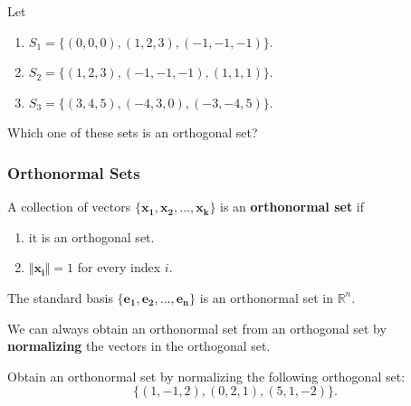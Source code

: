 \documentclass[20pt,a4paper]{extarticle}
\newcounter{example}
\newcounter{definition}
\begin{document}
	\vspace*{10pt}

	\begin{example}
	Let 
		\begin{enumerate}[label=\alph*)]
		\item $S_1 = \{ (0, 0, 0) , (1, 2, 3) , (-1, -1, -1) \}$.
		\item $S_2 = \{ (1, 2, 3 ) , (-1, -1, - 1) , (1, 1, 1) \}$.
		\item $S_3 = \{ (3, 4, 5) , (-4, 3, 0) , (-3, -4, 5) \}$. 
		\end{enumerate}
	Which one of these sets is an orthogonal set?
	\end{example}

	\begin{solution}

	\end{solution}

	\newpage 

	\subsubsection{Orthonormal Sets}

	\begin{definition}
	A collection of vectors $\{ \mathbf{x_1} , \mathbf{x_2} , \ldots , \mathbf{x_k} \}$ is an \textbf{orthonormal set} if
		\begin{enumerate}[label=\Circled{\arabic*}]
			\item it is an orthogonal set.
			\item $\Vert \mathbf{x_i} \Vert = 1$ for every index $i$.
		\end{enumerate}
	\end{definition}

	\vspace*{10pt}

	\begin{example}
	The standard basis $\{ \mathbf{e_1} , \mathbf{e_2} , \ldots , \mathbf{e_n} \}$ is an orthonormal set in $\mathbb{R}^n$.
	\end{example}

	We can always obtain an orthonormal set from an orthogonal set by \textbf{normalizing} the vectors in the orthogonal set.

	\begin{example}
	Obtain an orthonormal set by normalizing the following orthogonal set:
		\[
			\{ (1, -1, 2) , (0, 2, 1) , (5, 1, -2 ) \} .
		\]
	\end{example}
\end{document}
